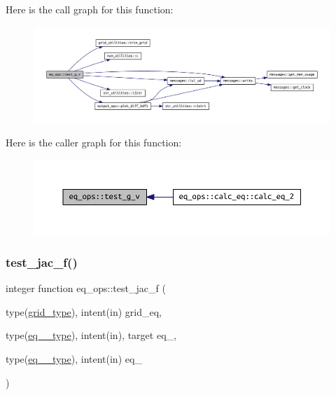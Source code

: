 Here is the call graph for this function\+:\nopagebreak
\begin{figure}[H]
\begin{center}
\leavevmode
\includegraphics[width=350pt]{namespaceeq__ops_a9811c83477d9d85f7401fd7957a590fc_cgraph}
\end{center}
\end{figure}
Here is the caller graph for this function\+:\nopagebreak
\begin{figure}[H]
\begin{center}
\leavevmode
\includegraphics[width=350pt]{namespaceeq__ops_a9811c83477d9d85f7401fd7957a590fc_icgraph}
\end{center}
\end{figure}
\mbox{\label{namespaceeq__ops_a05dcd4803b9c7845d3353614c9630c23}} 
\subsubsection{\texorpdfstring{test\+\_\+jac\+\_\+f()}{test\_jac\_f()}}
{\footnotesize\ttfamily integer function eq\+\_\+ops\+::test\+\_\+jac\+\_\+f (\begin{DoxyParamCaption}\item[{type(\hyperlink{structgrid__vars_1_1grid__type}{grid\+\_\+type}), intent(in)}]{grid\+\_\+eq,  }\item[{type(\hyperlink{structeq__vars_1_1eq__1__type}{eq\+\_\+1\+\_\+type}), intent(in), target}]{eq\+\_,  }\item[{type(\hyperlink{structeq__vars_1_1eq__2__type}{eq\+\_\+2\+\_\+type}), intent(in)}]{eq\+\_ }\end{DoxyParamCaption})}



